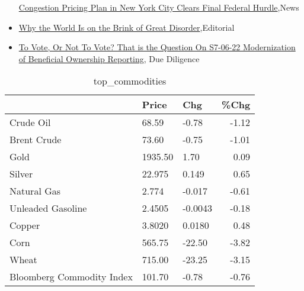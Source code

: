 \documentclass{article}%
\begin{document}
\begin{itemize}
\href{https://reddit.com/r/Economics/comments/14jx5q5/congestion\_pricing\_plan\_in\_new\_york\_city\_clears/}{Congestion Pricing Plan in New York City Clears Final Federal Hurdle},News%
\item%
\href{https://reddit.com/r/Economics/comments/14jvlwt/why\_the\_world\_is\_on\_the\_brink\_of\_great\_disorder/}{Why the World Is on the Brink of Great Disorder},Editorial%
\item%
\href{https://reddit.com/r/Superstonk/comments/14k25l9/to\_vote\_or\_not\_to\_vote\_that\_is\_the\_question\_on/}{To Vote, Or Not To Vote? That is the Question On S7-06-22 Modernization of Beneficial Ownership Reporting}, Due Diligence%
\end{itemize}%


\begin{table}[htbp]%
\caption{top\_commodities}%
\centering%
\begin{adjustbox}{width=1\textwidth}%
\begin{tabular}{lllr}
\toprule
                          &   Price &     Chg &  \%Chg \\
\midrule
               Crude Oil  &   68.59 &   -0.78 & -1.12 \\
             Brent Crude  &   73.60 &   -0.75 & -1.01 \\
                    Gold  & 1935.50 &    1.70 &  0.09 \\
                  Silver  &  22.975 &   0.149 &  0.65 \\
             Natural Gas  &   2.774 &  -0.017 & -0.61 \\
       Unleaded Gasoline  &  2.4505 & -0.0043 & -0.18 \\
                  Copper  &  3.8020 &  0.0180 &  0.48 \\
                    Corn  &  565.75 &  -22.50 & -3.82 \\
                   Wheat  &  715.00 &  -23.25 & -3.15 \\
Bloomberg Commodity Index &  101.70 &   -0.78 & -0.76 \\
\bottomrule
\end{tabular}
%
\end{adjustbox}%
\end{table}

%
\end{document}
